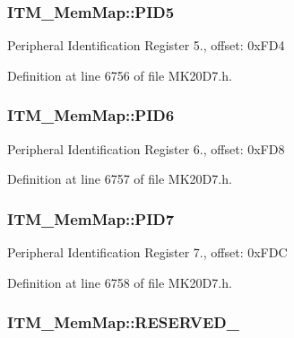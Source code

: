\subsubsection[{\texorpdfstring{P\+I\+D5}{PID5}}]{ I\+T\+M\+\_\+\+Mem\+Map\+::\+P\+I\+D5}\hypertarget{struct_i_t_m___mem_map_a44b9d410c8989eb78aa4ea68a32e4bc5}{}\label{struct_i_t_m___mem_map_a44b9d410c8989eb78aa4ea68a32e4bc5}
Peripheral Identification Register 5., offset\+: 0x\+F\+D4 

Definition at line 6756 of file M\+K20\+D7.\+h.

\subsubsection[{\texorpdfstring{P\+I\+D6}{PID6}}]{ I\+T\+M\+\_\+\+Mem\+Map\+::\+P\+I\+D6}\hypertarget{struct_i_t_m___mem_map_ab3ff032be95ac6f7ed1148ad6df2898b}{}\label{struct_i_t_m___mem_map_ab3ff032be95ac6f7ed1148ad6df2898b}
Peripheral Identification Register 6., offset\+: 0x\+F\+D8 

Definition at line 6757 of file M\+K20\+D7.\+h.

\subsubsection[{\texorpdfstring{P\+I\+D7}{PID7}}]{ I\+T\+M\+\_\+\+Mem\+Map\+::\+P\+I\+D7}\hypertarget{struct_i_t_m___mem_map_ab5d680cdaa89677231777f60835b9b1b}{}\label{struct_i_t_m___mem_map_ab5d680cdaa89677231777f60835b9b1b}
Peripheral Identification Register 7., offset\+: 0x\+F\+DC 

Definition at line 6758 of file M\+K20\+D7.\+h.

\subsubsection[{\texorpdfstring{R\+E\+S\+E\+R\+V\+E\+D\+\_\+0}{RESERVED_0}}]{ I\+T\+M\+\_\+\+Mem\+Map\+::\+R\+E\+S\+E\+R\+V\+E\+D\+\_}\hypertarget{struct_i_t_m___mem_map_ae16e10d3110f7c0ab9673a6ace654fc0}{}\label{struct_i_t_m___mem_map_ae16e10d3110f7c0ab9673a6ace654fc0}


